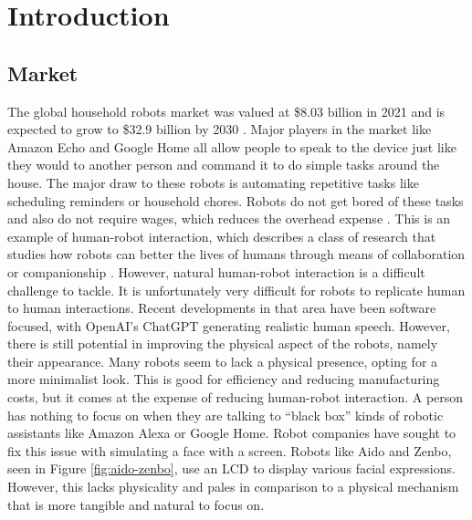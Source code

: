 \chapter{Introduction}
\section{Market}
The global household robots market was valued at \$8.03 billion in 2021 and is expected to grow to \$32.9 billion by 2030 \cite{polarismarketresearchlastHouseholdRobotsMarket2022}. Major players in the market like Amazon Echo and Google Home all allow people to speak to the device just like they would to another person and command it to do simple tasks around the house. The major draw to these robots is automating repetitive tasks like scheduling reminders or household chores. Robots do not get bored of these tasks and also do not require wages, which reduces the overhead expense \cite{polarismarketresearchlastHouseholdRobotsMarket2022}. This is an example of human-robot interaction, which describes a class of research that studies how robots can better the lives of humans through means of collaboration or companionship \cite{cornellbowerscisHumanRobotInteraction2023}. However, natural human-robot interaction is a difficult challenge to tackle. It is unfortunately very difficult for robots to replicate human to human interactions. Recent developments in that area have been software focused, with OpenAI's ChatGPT generating realistic human speech. However, there is still potential in improving the physical aspect of the robots, namely their appearance. Many robots seem to lack a physical presence, opting for a more minimalist look. This is good for efficiency and reducing manufacturing costs, but it comes at the expense of reducing human-robot interaction. A person has nothing to focus on when they are talking to ``black box'' kinds of robotic assistants like Amazon Alexa or Google Home. Robot companies have sought to fix this issue with simulating a face with a screen. Robots like Aido and Zenbo, seen in Figure \ref{fig:aido-zenbo}, use an LCD to display various facial expressions. However, this lacks physicality and pales in comparison to a physical mechanism that is more tangible and natural to focus on. 

